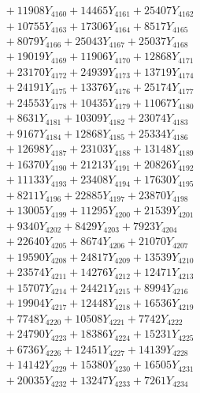 \documentclass[a4paper,10pt]{article}
\begin{document}
{\begin{align}
&\;  + 11908 Y_{4160} + 14465 Y_{4161} + 25407 Y_{4162} \\[0.3ex]
&\;  + 10755 Y_{4163} + 17306 Y_{4164} + 8517 Y_{4165} \\[0.3ex]
&\;  + 8079 Y_{4166} + 25043 Y_{4167} + 25037 Y_{4168} \\[0.5ex]\allowbreak
&\;  + 19019 Y_{4169} + 11906 Y_{4170} + 12868 Y_{4171} \\[0.3ex]
&\;  + 23170 Y_{4172} + 24939 Y_{4173} + 13719 Y_{4174} \\[0.3ex]
&\;  + 24191 Y_{4175} + 13376 Y_{4176} + 25174 Y_{4177} \\[0.3ex]
&\;  + 24553 Y_{4178} + 10435 Y_{4179} + 11067 Y_{4180} \\[0.3ex]
&\;  + 8631 Y_{4181} + 10309 Y_{4182} + 23074 Y_{4183} \\[0.3ex]
&\;  + 9167 Y_{4184} + 12868 Y_{4185} + 25334 Y_{4186} \\[0.3ex]
&\;  + 12698 Y_{4187} + 23103 Y_{4188} + 13148 Y_{4189} \\[0.3ex]
&\;  + 16370 Y_{4190} + 21213 Y_{4191} + 20826 Y_{4192} \\[0.3ex]
&\;  + 11133 Y_{4193} + 23408 Y_{4194} + 17630 Y_{4195} \\[0.3ex]
&\;  + 8211 Y_{4196} + 22885 Y_{4197} + 23870 Y_{4198} \\[0.5ex]\allowbreak
&\;  + 13005 Y_{4199} + 11295 Y_{4200} + 21539 Y_{4201} \\[0.3ex]
&\;  + 9340 Y_{4202} + 8429 Y_{4203} + 7923 Y_{4204} \\[0.3ex]
&\;  + 22640 Y_{4205} + 8674 Y_{4206} + 21070 Y_{4207} \\[0.3ex]
&\;  + 19590 Y_{4208} + 24817 Y_{4209} + 13539 Y_{4210} \\[0.3ex]
&\;  + 23574 Y_{4211} + 14276 Y_{4212} + 12471 Y_{4213} \\[0.3ex]
&\;  + 15707 Y_{4214} + 24421 Y_{4215} + 8994 Y_{4216} \\[0.3ex]
&\;  + 19904 Y_{4217} + 12448 Y_{4218} + 16536 Y_{4219} \\[0.3ex]
&\;  + 7748 Y_{4220} + 10508 Y_{4221} + 7742 Y_{4222} \\[0.3ex]
&\;  + 24790 Y_{4223} + 18386 Y_{4224} + 15231 Y_{4225} \\[0.3ex]
&\;  + 6736 Y_{4226} + 12451 Y_{4227} + 14139 Y_{4228} \\[0.5ex]\allowbreak
&\;  + 14142 Y_{4229} + 15380 Y_{4230} + 16505 Y_{4231} \\[0.3ex]
&\;  + 20035 Y_{4232} + 13247 Y_{4233} + 7261 Y_{4234} \\[0.3ex]

\end{align}}
\end{document}
